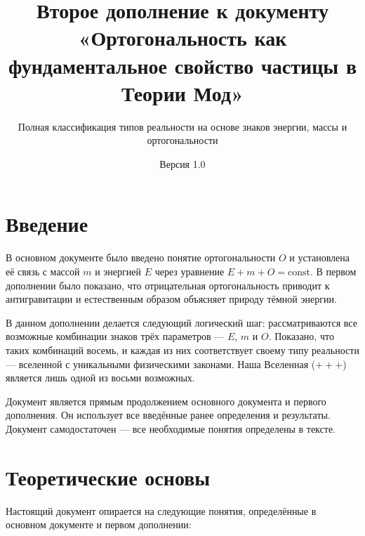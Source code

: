 \documentclass[12pt,a4paper]{article}
\title{\textbf{Второе дополнение к документу}\\
\large «Ортогональность как фундаментальное свойство частицы в Теории Мод»}
\subtitle{Полная классификация типов реальности на основе знаков энергии, массы и ортогональности}
\author{}
\date{Версия 1.0}
\begin{document}
\maketitle

\section{Введение}
В основном документе было введено понятие ортогональности $O$ и установлена её связь с массой $m$ и энергией $E$ через уравнение $E + m + O = \text{const}$. В первом дополнении было показано, что отрицательная ортогональность приводит к антигравитации и естественным образом объясняет природу тёмной энергии.

В данном дополнении делается следующий логический шаг: рассматриваются все возможные комбинации знаков трёх параметров --- $E$, $m$ и $O$. Показано, что таких комбинаций восемь, и каждая из них соответствует своему типу реальности --- вселенной с уникальными физическими законами. Наша Вселенная ($+ + +$) является лишь одной из восьми возможных.

Документ является прямым продолжением основного документа и первого дополнения. Он использует все введённые ранее определения и результаты. Документ самодостаточен --- все необходимые понятия определены в тексте.

\section{Теоретические основы}
Настоящий документ опирается на следующие понятия, определённые в основном документе и первом дополнении:
\end{document}

